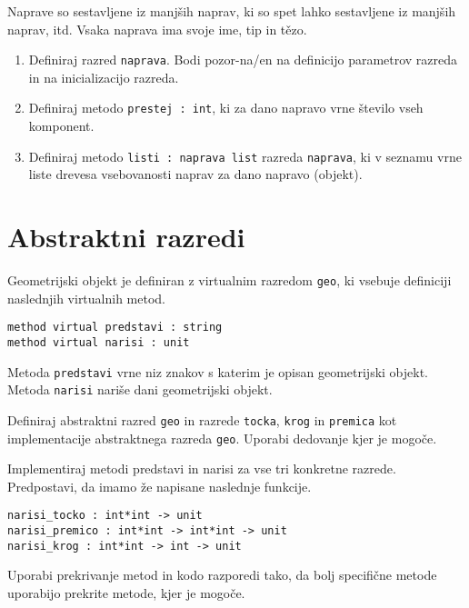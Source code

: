 \begin{ex}
Naprave so sestavljene iz manj\v sih naprav, ki so spet lahko sestavljene iz manj\v sih naprav, itd. Vsaka naprava ima svoje ime, tip in te\v\/zo.
\begin{enumerate}[label=(\Alph*)]
\item Definiraj razred \lstinline{naprava}. Bodi pozor-na/en na definicijo parametrov razreda in na inicializacijo razreda. 

\item Definiraj metodo \lstinline{prestej : int}, ki za dano napravo vrne število vseh komponent. 

\item Definiraj metodo \lstinline{listi : naprava list} razreda \lstinline{naprava}, ki v seznamu vrne liste drevesa vsebovanosti naprav za dano napravo (objekt).
\end{enumerate}
\end{ex} 








\section{Abstraktni razredi}


\begin{ex}
Geometrijski objekt je definiran z virtualnim razredom \lstinline{geo}, ki vsebuje definiciji naslednjih virtualnih metod.

\begin{lstlisting}
method virtual predstavi : string
method virtual narisi : unit 
\end{lstlisting}

Metoda \lstinline{predstavi} vrne niz znakov s katerim je opisan geometrijski objekt. Metoda \lstinline{narisi} nari\v se dani geometrijski objekt. 

Definiraj abstraktni razred \lstinline{geo} in razrede \lstinline{tocka}, \lstinline{krog} in \lstinline{premica} kot
implementacije abstraktnega razreda \texttt{geo}. Uporabi dedovanje kjer je mogo\v ce. 

Implementiraj metodi predstavi in narisi za vse tri konkretne razrede. Predpostavi, da imamo \v ze napisane naslednje funkcije.
\begin{lstlisting}
narisi_tocko : int*int -> unit
narisi_premico : int*int -> int*int -> unit
narisi_krog : int*int -> int -> unit
\end{lstlisting}

Uporabi prekrivanje metod in kodo razporedi tako, da bolj specifi\v cne metode uporabijo prekrite metode, kjer je mogo\v ce.
\end{ex}





